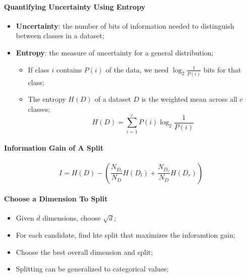       \paragraph{Quantifying Uncertainty Using Entropy}
      \begin{itemize}
        \item \textbf{Uncertainty}: the number of bits of information needed to distinguish between classes in a dataset;
        \item \textbf{Entropy}: the measure of uncertainty for a general distribution;
        \begin{itemize}
          \item If class $ i $ contains $ P\left( i \right) $ of the data, we need $ \log_{2} \frac{1}{ P\left( i \right) } $ bits for that class;
          \item The entropy $ H\left( D \right) $ of a dataset $ D $ is the weighted mean across all $ c $ classes;
          \begin{equation}
            H\left( D \right) = \sum_{i = 1}^{c} P\left( i \right) \log_{2} \frac{1}{ P\left( i \right) }
          \end{equation}
        \end{itemize}
      \end{itemize}
      
      \paragraph{Information Gain of A Split}
      \begin{equation}
        I = H\left( D \right) - \left( \frac{ N_{D_{l}} }{ N_{D} } H\left( D_{l} \right) + \frac{ N_{D_{r}} }{ N_{D} } H\left( D_{r} \right) \right)
      \end{equation}
      
      \paragraph{Choose a Dimension To Split}
      \begin{itemize}
        \item Given $ d $ dimensions, choose $ \sqrt{d} $;
        \item For each candidate, find hte split that maximizes the inforamtion gain;
        \item Choose the best overall dimension and split;
        \item Splitting can be generalized to categorical values;
      \end{itemize}
      
